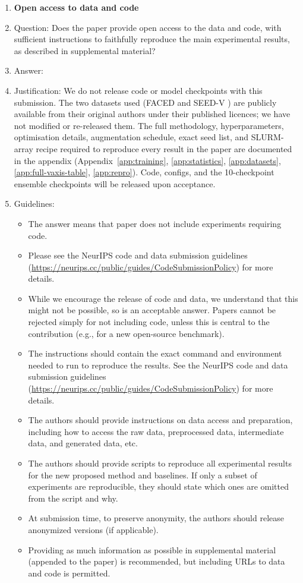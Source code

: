 \begin{enumerate}
\item {\bf Open access to data and code}
    \item[] Question: Does the paper provide open access to the data and code, with sufficient instructions to faithfully reproduce the main experimental results, as described in supplemental material?
    \item[] Answer: \answerNo{}
    \item[] Justification: We do not release code or model checkpoints with this submission. The two datasets used (FACED \citep{chen2023faced} and SEED-V \citep{liu2022seedv}) are publicly available from their original authors under their published licences; we have not modified or re-released them. The full methodology, hyperparameters, optimisation details, augmentation schedule, exact seed list, and SLURM-array recipe required to reproduce every result in the paper are documented in the appendix (Appendix~\ref{app:training}, \ref{app:statistics}, \ref{app:datasets}, \ref{app:full-vaxis-table}, \ref{app:repro}). Code, configs, and the 10-checkpoint ensemble checkpoints will be released upon acceptance.
    \item[] Guidelines:
    \begin{itemize}
        \item The answer \answerNA{} means that paper does not include experiments requiring code.
        \item Please see the NeurIPS code and data submission guidelines (\url{https://neurips.cc/public/guides/CodeSubmissionPolicy}) for more details.
        \item While we encourage the release of code and data, we understand that this might not be possible, so \answerNo{} is an acceptable answer. Papers cannot be rejected simply for not including code, unless this is central to the contribution (e.g., for a new open-source benchmark).
        \item The instructions should contain the exact command and environment needed to run to reproduce the results. See the NeurIPS code and data submission guidelines (\url{https://neurips.cc/public/guides/CodeSubmissionPolicy}) for more details.
        \item The authors should provide instructions on data access and preparation, including how to access the raw data, preprocessed data, intermediate data, and generated data, etc.
        \item The authors should provide scripts to reproduce all experimental results for the new proposed method and baselines. If only a subset of experiments are reproducible, they should state which ones are omitted from the script and why.
        \item At submission time, to preserve anonymity, the authors should release anonymized versions (if applicable).
        \item Providing as much information as possible in supplemental material (appended to the paper) is recommended, but including URLs to data and code is permitted.
    \end{itemize}


\end{enumerate}
